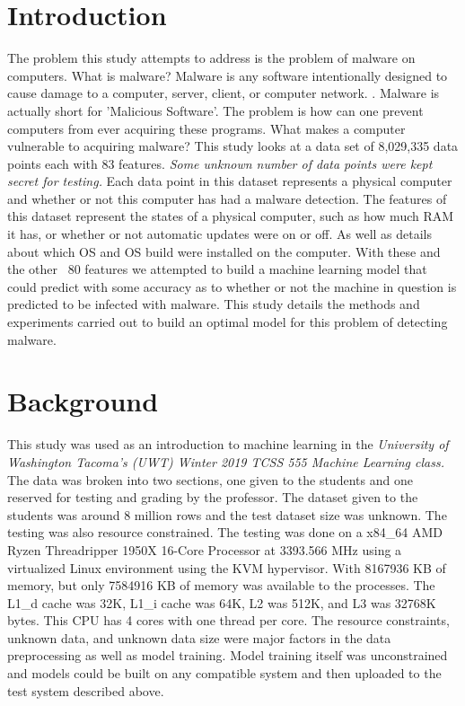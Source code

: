 \documentclass[sigconf]{acmart}
\begin{document}
\maketitle

\section{Introduction}
 The problem this study attempts to address is the problem of malware on computers. What is malware? Malware is any software intentionally designed to cause damage to a computer, server, client, or computer network. \cite{cite-Moir:2009}. Malware is actually short for 'Malicious Software'. The problem is how can one prevent computers from ever acquiring these programs. What makes a computer vulnerable to acquiring malware? This study looks at a data set of 8,029,335 data points each with 83 features. \textit{Some unknown number of data points were kept secret for testing.} Each data point in this dataset represents a physical computer and whether or not this computer has had a malware detection. The features of this dataset represent the states of a physical computer, such as how much RAM it has, or whether or not automatic updates were on or off. As well as details about which OS and OS build were installed on the computer. With these and the other ~80 features we attempted to build a machine learning model that could predict with some accuracy as to whether or not the machine in question is predicted to be infected with malware. This study details the methods and experiments carried out to build an optimal model for this problem of detecting malware.

\section{Background}
This study was used as an introduction to machine learning in the \textit{University of Washington Tacoma's (UWT) Winter 2019 TCSS 555 Machine Learning class.} The data was broken into two sections, one given to the students and one reserved for testing and grading by the professor. The dataset given to the students was around 8 million rows and the test dataset size was unknown. The testing was also resource constrained. The testing was done on a x84\_64 AMD Ryzen Threadripper 1950X 16-Core Processor at 3393.566 MHz using a virtualized Linux environment using the KVM hypervisor. With 8167936 KB of memory, but only 7584916 KB of memory was available to the processes. The L1\_d cache was 32K, L1\_i cache was 64K, L2 was 512K, and L3 was 32768K bytes. This CPU has 4 cores with one thread per core. The resource constraints, unknown data, and unknown data size were major factors in the data preprocessing as well as model training. Model training itself was unconstrained and models could be built on any compatible system and then uploaded to the test system described above. 
 
\end{document}
